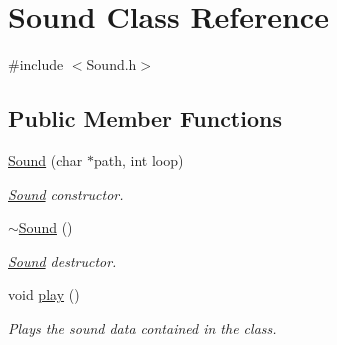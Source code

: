 \hypertarget{class_sound}{}\section{Sound Class Reference}
\label{class_sound}


{\ttfamily \#include $<$Sound.\+h$>$}

\subsection*{Public Member Functions}
\begin{DoxyCompactItemize}
\item 
\hyperlink{class_sound_a0b3f0e0944d4f58f722f9477d07c40a3}{Sound} (char $\ast$path, int loop)
\begin{DoxyCompactList}\small\item\em \hyperlink{class_sound}{Sound} constructor. \end{DoxyCompactList}\item 
\hyperlink{class_sound_a0907389078bf740be2a5763366ad3376}{$\sim$\+Sound} ()\hypertarget{class_sound_a0907389078bf740be2a5763366ad3376}{}\label{class_sound_a0907389078bf740be2a5763366ad3376}

\begin{DoxyCompactList}\small\item\em \hyperlink{class_sound}{Sound} destructor. \end{DoxyCompactList}\item 
void \hyperlink{class_sound_aad595b0dc5459e110b53a4e6b2adb0e4}{play} ()\hypertarget{class_sound_aad595b0dc5459e110b53a4e6b2adb0e4}{}\label{class_sound_aad595b0dc5459e110b53a4e6b2adb0e4}

\begin{DoxyCompactList}\small\item\em Plays the sound data contained in the class. \end{DoxyCompactList}\end{DoxyCompactItemize}
